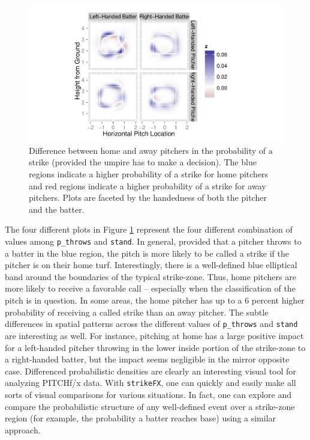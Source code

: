 \documentclass[12pt,]{isuthesis}
\begin{document}
\begin{figure}[htbp]
\centering
\includegraphics{images/prob-diff.pdf}
\caption{\label{fig:diff-probs}Difference between home and away pitchers in
the probability of a strike (provided the umpire has to make a
decision). The blue regions indicate a higher probability of a strike
for home pitchers and red regions indicate a higher probability of a
strike for away pitchers. Plots are faceted by the handedness of both
the pitcher and the batter.}
\end{figure}

The four different plots in Figure \ref{fig:diff-probs} represent the
four different combination of values among \texttt{p\_throws} and
\texttt{stand}. In general, provided that a pitcher throws to a batter
in the blue region, the pitch is more likely to be called a strike if
the pitcher is on their home turf. Interestingly, there is a
well-defined blue elliptical band around the boundaries of the typical
strike-zone. Thus, home pitchers are more likely to receive a favorable
call -- especially when the classification of the pitch is in question.
In some areas, the home pitcher has up to a 6 percent higher probability
of receiving a called strike than an away pitcher. The subtle
differences in spatial patterns across the different values of
\texttt{p\_throws} and \texttt{stand} are interesting as well. For
instance, pitching at home has a large positive impact for a left-handed
pitcher throwing in the lower inside portion of the strike-zone to a
right-handed batter, but the impact seems negligible in the mirror
opposite case. Differenced probabilistic densities are clearly an
interesting visual tool for analyzing PITCHf/x data. With
\texttt{strikeFX}, one can quickly and easily make all sorts of visual
comparisons for various situations. In fact, one can explore and compare
the probabilistic structure of any well-defined event over a strike-zone
region (for example, the probability a batter reaches base) using a
similar approach.
\end{document}
